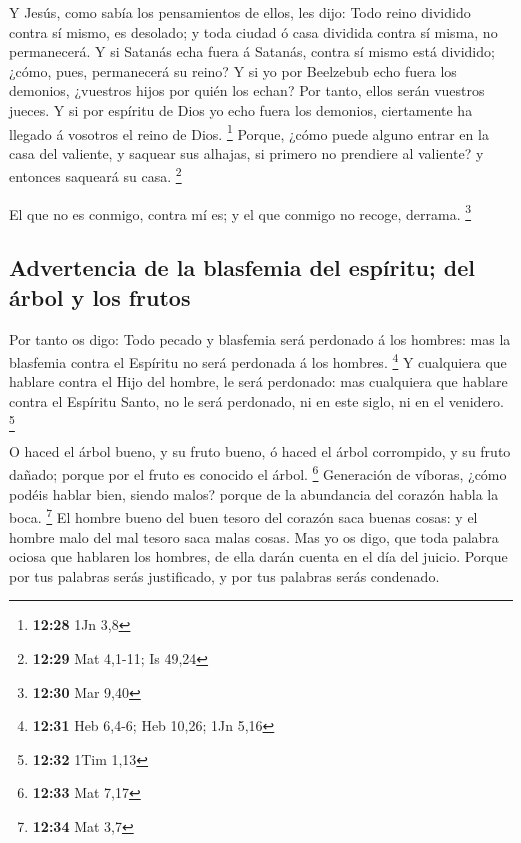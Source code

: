  Y Jesús, como sabía los pensamientos de ellos, les dijo:
Todo reino dividido contra sí mismo, es desolado; y toda ciudad ó casa
dividida contra sí misma, no permanecerá.  Y si Satanás
echa fuera á Satanás, contra sí mismo está dividido; ¿cómo, pues,
permanecerá su reino?  Y si yo por Beelzebub echo fuera los
demonios, ¿vuestros hijos por quién los echan? Por tanto, ellos serán
vuestros jueces.  Y si por espíritu de Dios yo echo fuera
los demonios, ciertamente ha llegado á vosotros el reino de Dios.
\footnote{\textbf{12:28} 1Jn 3,8}  Porque, ¿cómo puede
alguno entrar en la casa del valiente, y saquear sus alhajas, si primero
no prendiere al valiente? y entonces saqueará su casa. \footnote{\textbf{12:29}
  Mat 4,1-11; Is 49,24}

 El que no es conmigo, contra mí es; y el que conmigo no
recoge, derrama. \footnote{\textbf{12:30} Mar 9,40}

\hypertarget{advertencia-de-la-blasfemia-del-espuxedritu-del-uxe1rbol-y-los-frutos}{%
\subsection{Advertencia de la blasfemia del espíritu; del árbol y los
frutos}\label{advertencia-de-la-blasfemia-del-espuxedritu-del-uxe1rbol-y-los-frutos}}

 Por tanto os digo: Todo pecado y blasfemia será perdonado
á los hombres: mas la blasfemia contra el Espíritu no será perdonada á
los hombres. \footnote{\textbf{12:31} Heb 6,4-6; Heb 10,26; 1Jn 5,16}
 Y cualquiera que hablare contra el Hijo del hombre, le
será perdonado: mas cualquiera que hablare contra el Espíritu Santo, no
le será perdonado, ni en este siglo, ni en el venidero. \footnote{\textbf{12:32}
  1Tim 1,13}

 O haced el árbol bueno, y su fruto bueno, ó haced el árbol
corrompido, y su fruto dañado; porque por el fruto es conocido el árbol.
\footnote{\textbf{12:33} Mat 7,17}  Generación de víboras,
¿cómo podéis hablar bien, siendo malos? porque de la abundancia del
corazón habla la boca. \footnote{\textbf{12:34} Mat 3,7} 
El hombre bueno del buen tesoro del corazón saca buenas cosas: y el
hombre malo del mal tesoro saca malas cosas.  Mas yo os
digo, que toda palabra ociosa que hablaren los hombres, de ella darán
cuenta en el día del juicio.  Porque por tus palabras serás
justificado, y por tus palabras serás condenado.

